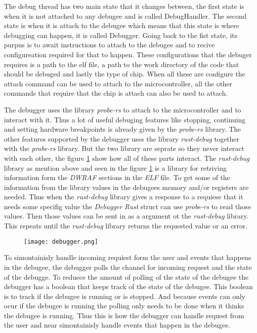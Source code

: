 
The debug thread has two main state that it changes between, the first state is when it is not attached to any \gls{debugee} and is called DebugHandler.
The second state is when it is attach to the \gls{debugee} which means that this state is where debugging can happen, it is called Debugger.
Going back to the fist state, its purpus is to await instructions to attach to the \gls{debugee} and to recive configureation required for that to happen.
These configurations that the debuger requires is a path to the elf file, a path to the work directory of the code that should be debuged and lastly the type of chip.
When all these are configure the attach command can be used to attach to the microcontroller, all the other commands that require that the chip is attach can also be used to attach.


The debugger uses the library \emph{probe-rs} \cite{probe} to attach to the microcontroller and to interact with it.
Thus a lot of useful debuging features like stopping, continuing and setting hardware breakpoints is already given by the \emph{probe-rs} library.
The other features supported by the debugger uses the library \emph{rust-debug} together with the \emph{probe-rs} library.
But the two library are seprate so they never interact with each other, the figure \ref{fig:debugger} show how all of these parts interact.
The \emph{rust-debug} library as mention above and seen in the figure \ref{fig:debugger} is a library for retriving information form the \emph{DWRAF} sections in the \emph{ELF} file.
To get some of the information from the library values in the \glspl{debugee} memory and/or registers are needed.
Thus when the \emph{rust-debug} library gives a response to a requiese that it needs some specifig value the \emph{Debugger} \emph{Rust} struct can use \emph{probe-rs} to read those values.
Then those values can be sent in as a argument ot the \emph{rust-debug} library.
This repeats until the \emph{rust-debug} library returns the requested value or an error.


\begin{figure}[h]
    \centering
    \texttt{[image: debugger.png]}
    \label{fig:debugger}
\end{figure}


To simontainisly handle incoming requiest form the user and events that happens in the \gls{debugee}, the debugger polls the channel for incoming request and the state of the debugge.
To reduece the amount of polling of the state of the \gls{debugee} the debugger has a boolean that keeps track of the state of the \gls{debugee}.
This boolean is to track if the \gls{debugee} is running or is stopped.
And because events can only ocur if the \gls{debugee} is running the polling only needs to be done when it thinks the \gls{debugee} is running.
Thus this is how the debugger can handle request from the user and near simontainisly handle events that happen in the \gls{debugee}.


